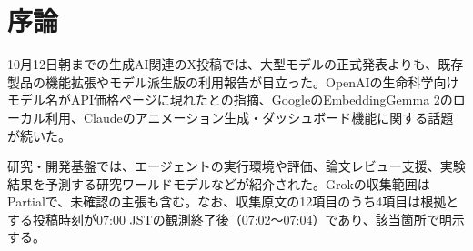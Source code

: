 \section*{序論}
10月12日朝までの生成AI関連のX投稿では、大型モデルの正式発表よりも、既存製品の機能拡張やモデル派生版の利用報告が目立った。OpenAIの生命科学向けモデル名がAPI価格ページに現れたとの指摘、GoogleのEmbeddingGemma 2のローカル利用、Claudeのアニメーション生成・ダッシュボード機能に関する話題が続いた。

研究・開発基盤では、エージェントの実行環境や評価、論文レビュー支援、実験結果を予測する研究ワールドモデルなどが紹介された。Grokの収集範囲はPartialで、未確認の主張も含む。なお、収集原文の12項目のうち4項目は根拠とする投稿時刻が07:00 JSTの観測終了後（07:02～07:04）であり、該当箇所で明示する。
